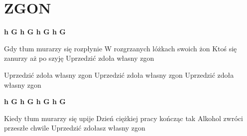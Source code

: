 \documentclass[../../../songbook.tex]{subfiles}
\begin{document}
\TabPositions{8cm} %
\section*{ZGON}
{}
\vspace{0.5cm}
{\color{red}\textbf{h G h G h G h G} } \newline

Gdy tłum murarzy się rozpłynie \newline
W rozgrzanych lóżkach swoich żon \newline  
Ktoś się zanurzy aż po szyję \newline
Uprzedzić zdoła własny zgon \newline
      
\-\hspace{1cm} Uprzedzić zdoła własny zgon \newline
\-\hspace{1cm} Uprzedzić zdoła własny zgon \newline
\-\hspace{1cm} Uprzedzić zdoła własny zgon \newline

{\color{red}\textbf{h G h G h G h G} } \newline

Kiedy tłum murarzy się upije \newline
Dzień ciężkiej pracy kończąc tak \newline
Alkohol zwróci przeszłe chwile \newline
Uprzedzić zdołasz własny zgon \newline
\end{document}
